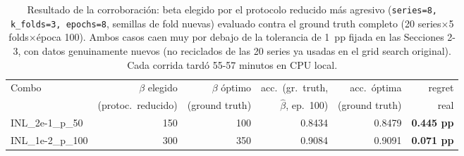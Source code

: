 \begin{table}[htbp]
\centering
\begin{tabular}{@{}lrrrrr@{}}
\toprule
Combo & $\beta$ elegido & $\beta$ óptimo & acc.\ (gr.\ truth, & acc.\ óptima & regret \\
 & (protoc.\ reducido) & (ground truth) & $\hat\beta$, ep.\ 100) & (ground truth) & real \\
\midrule
INL\_2e-1\_p\_50 & 150 & 100 & 0.8434 & 0.8479 & \textbf{0.445 pp} \\
INL\_1e-2\_p\_100 & 300 & 350 & 0.9084 & 0.9091 & \textbf{0.071 pp} \\
\bottomrule
\end{tabular}
\caption{Resultado de la corroboración: beta elegido por el protocolo reducido más agresivo
(\texttt{series=8, k\_folds=3, epochs=8}, semillas de fold nuevas) evaluado contra el ground
truth completo (20 series$\times$5 folds$\times$época 100). Ambos casos caen muy por debajo de
la tolerancia de 1~pp fijada en las Secciones 2-3, con datos genuinamente nuevos (no reciclados
de las 20 series ya usadas en el grid search original). Cada corrida tardó 55-57 minutos en CPU
local.}
\end{table}
